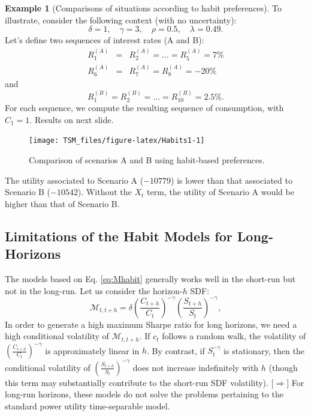 \documentclass[
  12pt,
]{book}
\theoremstyle{definition}
\theoremstyle{definition}
\newtheorem{example}{Example}[chapter]
\theoremstyle{definition}
\theoremstyle{definition}
\theoremstyle{remark}
\begin{document}
\begin{example}[Comparisons of situations according to habit preferences]
\protect\hypertarget{exm:habit}{}\label{exm:habit}To illustrate, consider the following context (with no uncertainty):
\[
\delta = 1,\quad \gamma = 3, \quad \rho = 0.5, \quad \lambda = 0.49.
\]
Let's define two sequences of interest rates (A and B):
\begin{eqnarray*}
R^{(A)}_1 &=&R^{(A)}_2 =\dots=R^{(A)}_5 =  7\% \\
R^{(A)}_6 &=&R^{(A)}_7 =R^{(A)}_8 =  -20\%
\end{eqnarray*}
and
\[
R^{(B)}_1 =R^{(B)}_2 =\dots=R^{(B)}_{10} =  2.5\%.
\]
For each sequence, we compute the resulting sequence of consumption, with \(C_1=1\).
Results on next slide.

\begin{figure}
\texttt{[image: TSM\_files/figure-latex/Habits1-1]} \caption{Comparison of scenarios A and B using habit-based preferences.}\label{fig:Habits1}
\end{figure}

The utility associated to Scenario A (\(-10779\)) is lower than that associated to Scenario B (\(-10542\)).
Without the \(X_t\) term, the utility of Scenario A would be higher than that of Scenario B.
\end{example}

\hypertarget{limitations-of-the-habit-models-for-long-horizons}{%
\subsection{Limitations of the Habit Models for Long-Horizons}\label{limitations-of-the-habit-models-for-long-horizons}}

The models based on Eq. \eqref{eq:Mhabit} generally works well in the short-run but not in the long-run. Let us consider the horizon-\(h\) SDF:
\[
\mathcal{M}_{t,t+h} = \delta \left( \frac{C_{t+h}}{C_t} \right)^{-\gamma}\left( \frac{S_{t+h}}{S_t} \right)^{-\gamma},
\]
In order to generate a high maximum Sharpe ratio for long horizons, we need a high conditional volatility of \(\mathcal{M}_{t,t+h}\).
If \(c_t\) follows a random walk, the volatility of \(\left( \frac{C_{t+h}}{C_t} \right)^{-\gamma}\) is approximately linear in \(h\).
By contrast, if \(S_t^{-\gamma}\) is stationary, then the conditional volatility of \(\left( \frac{S_{t+h}}{S_t} \right)^{-\gamma}\) does not increase indefinitely with \(h\) (though this term may substantially contribute to the short-run SDF volatility).
{[}\(\Rightarrow\){]} For long-run horizons, these models do not solve the problems pertaining to the standard power utility time-separable model.
\end{document}
